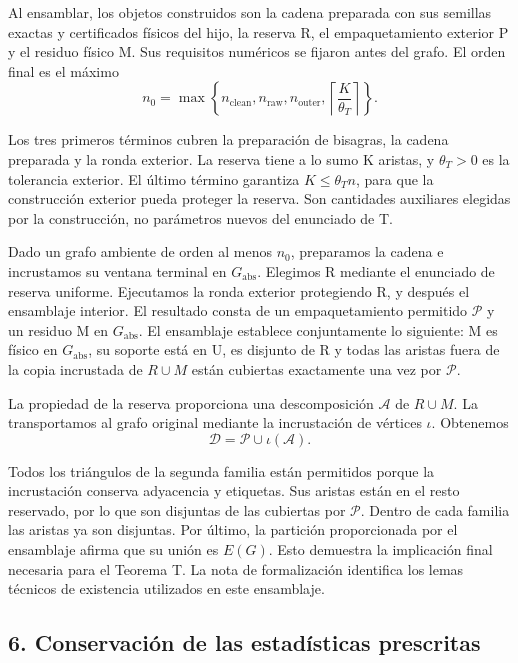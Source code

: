 \documentclass[spanish,11pt,a4paper]{article}
\begin{document}
Al ensamblar, los objetos construidos son la cadena preparada con sus semillas exactas y certificados físicos del hijo, la reserva R, el empaquetamiento exterior P y el residuo físico M. Sus requisitos numéricos se fijaron antes del grafo. El orden final es el máximo
\[n_0=\max\left\{
n_{\mathrm{clean}},n_{\mathrm{raw}},n_{\mathrm{outer}},
\left\lceil\frac{K}{\theta_T}\right\rceil
\right\}.                                                         \tag{5.2}\]

Los tres primeros términos cubren la preparación de bisagras, la cadena preparada y la ronda exterior. La reserva tiene a lo sumo K aristas, y \(\theta_T>0\) es la tolerancia exterior. El último término garantiza \(K\leq\theta_T n\), para que la construcción exterior pueda proteger la reserva. Son cantidades auxiliares elegidas por la construcción, no parámetros nuevos del enunciado de T.

Dado un grafo ambiente de orden al menos \(n_0\), preparamos la cadena e incrustamos su ventana terminal en \(G_{\mathrm{abs}}\). Elegimos R mediante el enunciado de reserva uniforme. Ejecutamos la ronda exterior protegiendo R, y después el ensamblaje interior. El resultado consta de un empaquetamiento permitido \(\mathcal P\) y un residuo M en \(G_{\mathrm{abs}}\). El ensamblaje establece conjuntamente lo siguiente: M es físico en \(G_{\mathrm{abs}}\), su soporte está en U, es disjunto de R y todas las aristas fuera de la copia incrustada de \(R\cup M\) están cubiertas exactamente una vez por \(\mathcal P\).

La propiedad de la reserva proporciona una descomposición \(\mathcal A\) de \(R\cup M\). La transportamos al grafo original mediante la incrustación de vértices \(\iota\). Obtenemos
\[\mathcal D=\mathcal P\cup\iota(\mathcal A).                         \tag{5.3}\]

Todos los triángulos de la segunda familia están permitidos porque la incrustación conserva adyacencia y etiquetas. Sus aristas están en el resto reservado, por lo que son disjuntas de las cubiertas por \(\mathcal P\). Dentro de cada familia las aristas ya son disjuntas. Por último, la partición proporcionada por el ensamblaje afirma que su unión es \(E(G)\). Esto demuestra la implicación final necesaria para el Teorema T. La nota de formalización identifica los lemas técnicos de existencia utilizados en este ensamblaje.

\subsection{6. Conservación de las estadísticas prescritas}\label{conservaciuxf3n-de-las-estaduxedsticas-prescritas}
\end{document}
